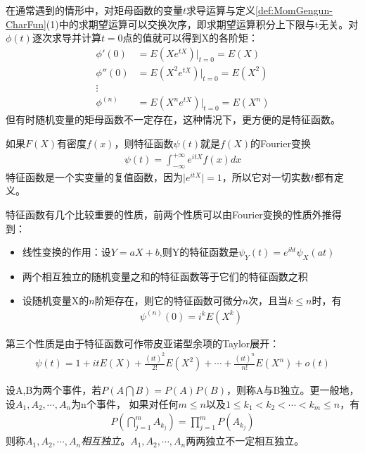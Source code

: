 在通常遇到的情形中，对矩母函数的变量\(t\)求导运算与定义\ref{def:MomGengun-CharFun}(1)中的求期望运算可以交换次序，即求期望运算积分上下限与t无关。对\(\phi(t)\)逐次求导并计算\(t=0\)点的值就可以得到X的各阶矩：
\begin{align*}
	\phi '(0)   & =E(Xe^{tX})|_{t=0}=E(X)      \\
	\phi ''(0)  & =E(X^2e^{tX})|_{t=0}=E(X^2)  \\
	\vdots                                     \\
	\phi ^{(n)} & =E(X^n e^{tX})|_{t=0}=E(X^n)
\end{align*}
但有时随机变量的矩母函数不一定存在，这种情况下，更方便的是特征函数。

如果\(F(X)\)有密度\(f(x)\)，则特征函数\(\psi(t)\)就是\(f(X)\)的Fourier变换
\begin{align*}
	\psi(t)=\int_{-\infty}^{+\infty}e^{itX}f(x)dx
\end{align*}
特征函数是一个实变量的复值函数，因为\(\lvert e^{itX}\rvert=1\)，所以它对一切实数\(t\)都有定义。

特征函数有几个比较重要的性质，前两个性质可以由Fourier变换的性质外推得到：
\begin{itemize}
	\item 线性变换的作用：设\(Y=aX+b\),则Y的特征函数是\(\psi_Y(t)=e^{ibt}\psi_X(at)\)
	\item 两个相互独立的随机变量之和的特征函数等于它们的特征函数之积
	\item 设随机变量X的\(n\)阶矩存在，则它的特征函数可微分\(n\)次，且当\(k\leqslant n\)时，有
	      \begin{align*}
		      \psi^{(n)}(0)=i^kE(X^k)
	      \end{align*}
\end{itemize}
第三个性质是由于特征函数可作带皮亚诺型余项的Taylor展开：
\begin{align*}
	\psi(t)=1+itE(X)+\frac{(it)^2}{2!}E(X^2)+\cdots+\frac{(it)^n}{n!}E(X^n)+o(t)
\end{align*}

\begin{definition}\label{def:independent}
	设A,B为两个事件，若\(P(A\bigcap B)=P(A)P(B)\)，则称A与B独立。更一般地，设\(A_1,A_2,\cdots,A_n\)为n个事件，
	如果对任何\(m\leqslant n\)以及\(1\leqslant k_1 < k_2<\cdots < k_m \leqslant n\)，有
	\begin{align*}
		P(\bigcap_{j=1}^{m}A_{k_j})=\prod_{j=1}^{m}P(A_{k_j})
	\end{align*}
	则称\(A_1,A_2,\cdots,A_n\)\emph{相互独立}。\(A_1,A_2,\cdots,A_n\)两两独立不一定相互独立。
\end{definition}

